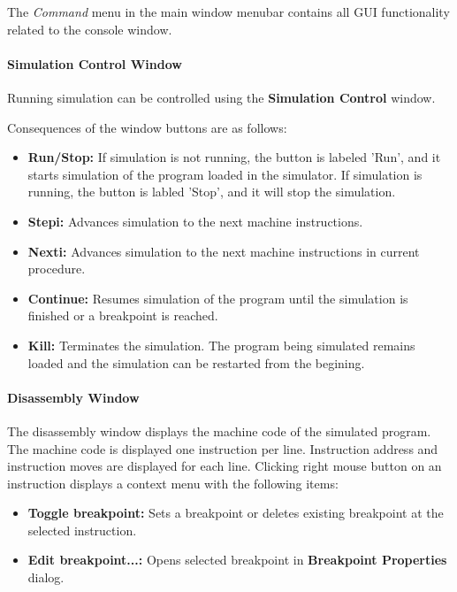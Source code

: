 \documentclass[twoside]{tceusermanual}
\begin{document}
The \emph{Command} menu in the main window menubar contains all GUI
functionality related to the console window.


\paragraph{Simulation Control Window}

Running simulation can be controlled using the \textbf{Simulation Control}
window.

Consequences of the window buttons are as follows:
\begin{itemize}
\item \textbf{Run/Stop:} If simulation is not running, the button is
labeled 'Run', and it starts simulation of the program loaded in the
simulator. If simulation is running, the button is labled 'Stop', and
it will stop the simulation.

\item \textbf{Stepi:} Advances simulation to the next machine instructions.

\item \textbf{Nexti:} Advances simulation to the next machine instructions
in current procedure.

\item \textbf{Continue:} Resumes simulation of the program until the
simulation is finished or a breakpoint is reached.
\item \textbf{Kill:} Terminates the simulation. The program being simulated
remains loaded and the simulation can be restarted from the begining.
\end{itemize}


\paragraph{Disassembly Window}
\label{sec:mcode_win}


The disassembly window displays the
machine code of the simulated program. The machine code is displayed
one instruction per line. Instruction address and instruction
moves are displayed for each line.
Clicking right mouse button on an instruction displays a context menu with the
following items:
\begin{itemize}
\item \textbf{Toggle breakpoint:} Sets a breakpoint or deletes existing 
breakpoint at the selected instruction.
\item \textbf{Edit breakpoint...:} Opens selected breakpoint in
\textbf{Breakpoint Properties} dialog.

\end{itemize}
\end{document}

